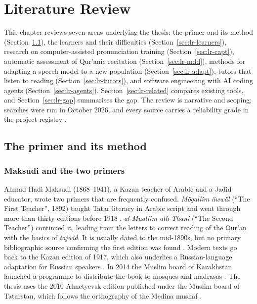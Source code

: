 \chapter{Literature Review}\label{ch:review}

This chapter reviews seven areas underlying the thesis: the primer and its method
(Section~\ref{sec:lr-primer}), the learners and their difficulties (Section~\ref{sec:lr-learners}),
research on computer-assisted pronunciation training (Section~\ref{sec:lr-capt}), automatic assessment of
Qur'anic recitation (Section~\ref{sec:lr-mdd}), methods for adapting a speech model to a new population
(Section~\ref{sec:lr-adapt}), tutors that listen to reading
(Section~\ref{sec:lr-tutors}), and software engineering with AI coding agents (Section~\ref{sec:lr-agents}). Section~\ref{sec:lr-related} compares existing tools, and
Section~\ref{sec:lr-gap} summarises the gap. The review is narrative and scoping; searches were run in
October 2026, and every source carries a reliability grade in the project registry \cite{SRC-038}.

\section{The primer and its method}\label{sec:lr-primer}

\subsection{Maksudi and the two primers}

Ahmad Hadi Maksudi (1868--1941), a Kazan teacher of Arabic and a Jadid educator, wrote two primers that
are frequently confused. \emph{Mögallim äwwäl} (``The First Teacher'', 1892) taught Tatar literacy in
Arabic script and went through more than thirty editions before 1918 \cite{SRC-015,SRC-019}.
\emph{al-Muallim ath-Thani} (``The Second Teacher'') continued it, leading from the letters to correct reading
of the Qur'an with the basics of \emph{tajwid}. It is usually dated to the mid-1890s, but no primary
bibliographic source confirming the first edition was found \cite{SRC-018}. Modern texts go back to the
Kazan edition of 1917, which also underlies a Russian-language adaptation for Russian speakers
\cite{SRC-024}. In 2014 the Muslim board of Kazakhstan launched a programme to distribute the book to
mosques and madrasas \cite{SRC-020}. The thesis uses the 2010 Almetyevsk edition published under the
Muslim board of Tatarstan, which follows the orthography of the Medina mushaf \cite{SRC-040}.

